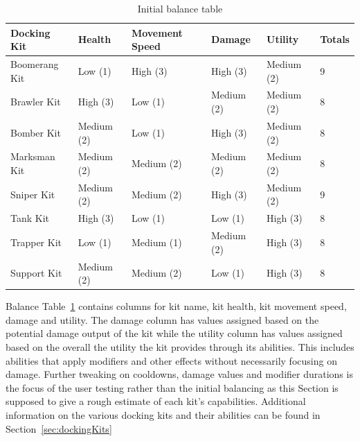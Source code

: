 \begin{table}[tbph]
\centering
\caption{Initial balance table}
\label{tab:initBalance}
\begin{tabular}{@{}llllll@{}}
\toprule
\textbf{Docking Kit} & \textbf{Health} & \textbf{Movement Speed} & \textbf{Damage} & \textbf{Utility} & \textbf{Totals} \\ \midrule
Boomerang Kit        & Low (1)         & High (3)                & High (3)        & Medium (2)       & 9               \\
Brawler Kit          & High (3)        & Low (1)                 & Medium (2)      & Medium (2)       & 8               \\
Bomber Kit           & Medium (2)      & Low (1)                 & High (3)        & Medium (2)       & 8               \\
Marksman Kit         & Medium (2)      & Medium (2)              & Medium (2)      & Medium (2)       & 8               \\
Sniper Kit           & Medium (2)      & Medium (2)              & High (3)        & Medium (2)       & 9               \\
Tank Kit             & High (3)        & Low (1)                 & Low (1)         & High (3)         & 8               \\
Trapper Kit          & Low  (1)        & Medium (1)              & Medium (2)      & High (3)         & 8               \\
Support Kit          & Medium (2)      & Medium (2)              & Low (1)         & High (3)         & 8               \\ \bottomrule
\end{tabular}
\end{table}

Balance Table~\ref{tab:initBalance} contains columns for kit name, kit health, kit movement speed, damage and utility. The damage column has values assigned based on the potential damage output of the kit while the utility column has values assigned based on the overall the utility the kit provides through its abilities. This includes abilities that apply modifiers and other effects without necessarily focusing on damage. Further tweaking on cooldowns, damage values and modifier durations is the focus of the user testing rather than the initial balancing as this Section is supposed to give a rough estimate of each kit's capabilities. 
Additional information on the various docking kits and their abilities can be found in Section~\ref{sec:dockingKits}

